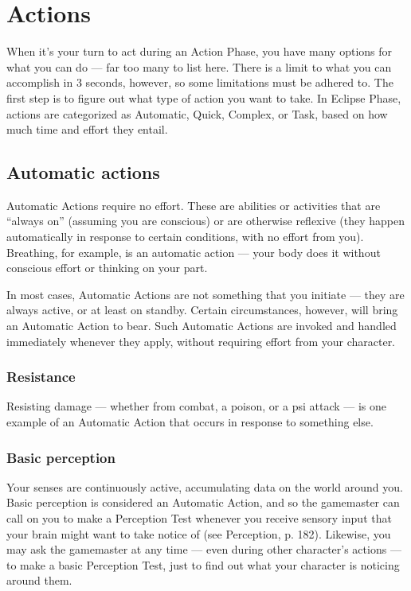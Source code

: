 \section{Actions}
\label{sec:actions}

When it’s your turn to act during an Action Phase, you have many options for what you can do --- far too many to list here. There is a limit to what you can accomplish in 3 seconds, however, so some limitations must be adhered to. The first step is to figure out what type of action you want to take. In Eclipse Phase, actions are categorized as Automatic, Quick, Complex, or Task, based on how much time and effort they entail.


\subsection{Automatic actions}
\label{sec:combat-automatic-actions}

Automatic Actions require no effort. These are abilities or activities that are ``always on'' (assuming you are conscious) or are otherwise reflexive (they happen automatically in response to certain conditions, with no effort from you). Breathing, for example, is an automatic action --- your body does it without conscious effort or thinking on your part.

In most cases, Automatic Actions are not something that you initiate --- they are always active, or at least on standby. Certain circumstances, however, will bring an Automatic Action to bear. Such Automatic Actions are invoked and handled immediately whenever they apply, without requiring effort from your character.

\subsubsection{Resistance}

Resisting damage --- whether from combat, a poison, or a psi attack --- is one example of an Automatic Action that occurs in response to something else.

\subsubsection{Basic perception}

Your senses are continuously active, accumulating data on the world around you. Basic perception is considered an Automatic Action, and so the gamemaster can call on you to make a Perception Test whenever you receive sensory input that your brain might want to take notice of (see Perception, p. 182). Likewise, you may ask the gamemaster at any time --- even during other character’s actions --- to make a basic Perception Test, just to find out what your character is noticing around them.

